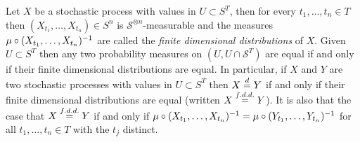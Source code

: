 \begin{lem}\label{ProcessLawsAndFDDs}   Let $X$ be a stochastic process
  with values in $U \subset S^T$, then for every $t_1,
  \dotsc, t_n \in T$ then $(X_{t_1}, \dotsc, X_{t_n}) \in S^n$ is
  $\mathcal{S}^{\otimes n}$-measurable and the measures
  $\mu \circ (X_{t_1}, \dotsc, X_{t_n})^{-1}$ are called the
  \emph{finite dimensional distributions} of $X$. Given $U \subset
  S^T$ then any two probability measures on $(U, U \cap
  \mathcal{S}^T)$ are equal if and only if their finite
  dimensional distributions are equal.  In particular, if $X$ and $Y$ are
  two stochastic processes with values in $U \subset S^T$ then $X \overset{d}= Y$ if and only if their
  finite dimensional distributions are equal (written $X \overset{f.d.d.}= Y$).
  It is also that the case that $X \overset{f.d.d.}= Y$ if and only if
  $\mu \circ (X_{t_1}, \dotsc, X_{t_n})^{-1} =
  \mu \circ (Y_{t_1}, \dotsc, Y_{t_n})^{-1}$ for all $t_1, \dotsc,
  t_n \in T$ with the $t_j$ distinct.
\end{lem}
